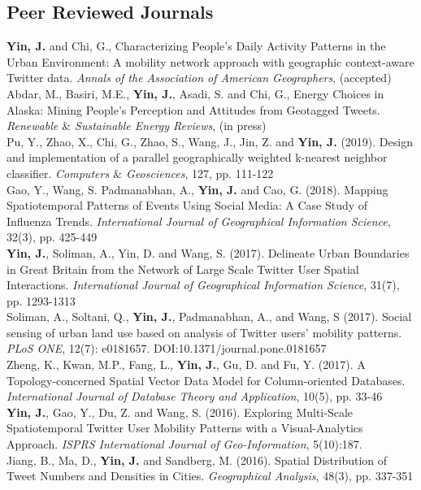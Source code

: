 \documentclass[11pt, a4paper]{article}
\newcommand{\years}[1]{\marginnote{\scriptsize #1}}
\begin{document}
\subsection*{Peer Reviewed Journals}
\noindent
\years{2020}\textbf{Yin, J.} and  Chi, G., Characterizing People’s Daily Activity Patterns in the Urban Environment: A mobility network approach with geographic context-aware Twitter data. \textit{Annals of the Association of American Geographers}, (accepted)\\
\years{2020}Abdar, M., Basiri, M.E., \textbf{Yin, J.}, Asadi, S. and Chi, G., Energy Choices in Alaska: Mining People's Perception and Attitudes from Geotagged Tweets. \textit{Renewable $\&$ Sustainable Energy Reviews}, (in press)\\
\years{2019}Pu, Y., Zhao, X., Chi, G., Zhao, S., Wang, J., Jin, Z. and \textbf{Yin, J.} (2019). Design and implementation of a parallel geographically weighted k-nearest neighbor classifier. \textit{Computers $\&$ Geosciences}, 127, pp. 111-122\\
\years{2018}Gao, Y., Wang, S. Padmanabhan, A., \textbf{Yin, J.} and Cao, G. (2018). Mapping Spatiotemporal Patterns of Events Using Social Media: A Case Study of Influenza Trends. \textit{International Journal of Geographical Information Science}, 32(3), pp. 425-449\\
\years{2017}\textbf{Yin, J.}, Soliman, A., Yin, D. and Wang, S. (2017). Delineate Urban Boundaries in Great Britain from the Network of Large Scale Twitter User Spatial Interactions. \textit{International Journal of Geographical Information Science}, 31(7), pp. 1293-1313\\
\years{2017}Soliman, A., Soltani, Q., \textbf{Yin, J.}, Padmanabhan, A., and Wang, S (2017). Social sensing of urban land use based on analysis of Twitter users' mobility patterns. \textit{PLoS ONE}, 12(7): e0181657. DOI:10.1371/journal.pone.0181657\\
\years{2017}Zheng, K., Kwan, M.P., Fang, L., \textbf{Yin, J.}, Gu, D. and Fu, Y. (2017). A Topology-concerned Spatial Vector Data Model for Column-oriented Databases. \textit{International Journal of Database Theory and Application}, 10(5), pp. 33-46\\
\years{2016}\textbf{Yin, J.}, Gao, Y., Du, Z. and Wang, S. (2016). Exploring Multi-Scale Spatiotemporal Twitter User Mobility Patterns with a Visual-Analytics Approach. \textit{ISPRS International Journal of Geo-Information}, 5(10):187.\\
\years{2016}Jiang, B., Ma, D., \textbf{Yin, J.} and Sandberg, M. (2016). Spatial Distribution of Tweet Numbers and Densities in Cities. \textit{Geographical Analysis}, 48(3), pp. 337-351\\
\end{document}
